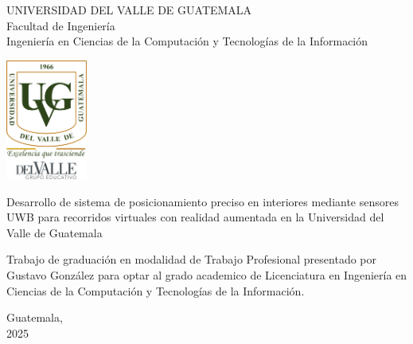 \documentclass{article}
\begin{document}
\begin{center}
    \begin{doublespace}
        \thispagestyle{empty}  %
        \Large{UNIVERSIDAD DEL VALLE DE GUATEMALA}\\
        Facultad de Ingeniería \\
        Ingeniería en Ciencias de la Computación y Tecnologías de la Información 
    
        \vspace{15mm} 
        \includegraphics[width=0.2\textwidth]{images/Uvg_logo.jpg}
    
        \vspace{15mm} 
        {\Large  Desarrollo de sistema de posicionamiento preciso en interiores mediante sensores UWB para recorridos virtuales con realidad aumentada en la Universidad del Valle de Guatemala}
    
        \vspace{10mm} 
        {\Large Trabajo de graduación en modalidad de Trabajo Profesional presentado por Gustavo González
    para optar al grado academico de Licenciatura en Ingeniería en Ciencias de la Computación y Tecnologías de la Información.}
    
        {\Large Guatemala, \\ 2025}
        
    \end{doublespace}
    \end{center}




\setcounter{page}{1} %
\end{document}
